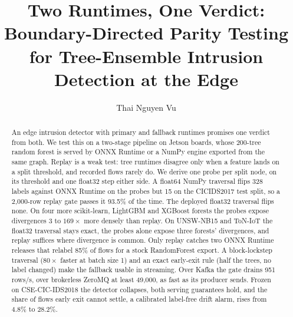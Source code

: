 \documentclass[runningheads]{llncs}
\begin{document}
\renewcommand{\figurename}{Fig.}

\title{Two Runtimes, One Verdict: Boundary-Directed Parity Testing for Tree-Ensemble Intrusion Detection at the Edge}


\author{Thai Nguyen Vu}



\maketitle

\begin{abstract}
An edge intrusion detector with primary and fallback runtimes promises one verdict from both. We test this on a two-stage pipeline on Jetson boards, whose 200-tree random forest is served by ONNX Runtime or a NumPy engine exported from the same graph. Replay is a weak test: tree runtimes disagree only when a feature lands on a split threshold, and recorded flows rarely do. We derive one probe per split node, on its threshold and one float32 step either side. A float64 NumPy traversal flips 328 labels against ONNX Runtime on the probes but 15 on the CICIDS2017 test split, so a 2{,}000-row replay gate passes it 93.5\% of the time. The deployed float32 traversal flips none. On four more scikit-learn, LightGBM and XGBoost forests the probes expose divergences 3 to $169\times$ more densely than replay. On UNSW-NB15 and ToN-IoT the float32 traversal stays exact, the probes alone expose three forests' divergences, and replay suffices where divergence is common. Only replay catches two ONNX Runtime releases that relabel 85\% of flows for a stock RandomForest export. A block-lockstep traversal ($80\times$ faster at batch size 1) and an exact early-exit rule (half the trees, no label changed) make the fallback usable in streaming. Over Kafka the gate drains 951\,rows/s, over brokerless ZeroMQ at least 49{,}000, as fast as its producer sends. Frozen on CSE-CIC-IDS2018 the detector collapses, both serving guarantees hold, and the share of flows early exit cannot settle, a calibrated label-free drift alarm, rises from 4.8\% to 28.2\%.

\end{abstract}
\end{document}
